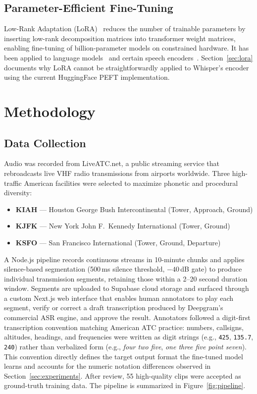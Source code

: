 \documentclass[11pt,a4paper]{article}
\begin{document}
\subsection{Parameter-Efficient Fine-Tuning}

Low-Rank Adaptation (LoRA)~\cite{hu2021lora} reduces the number of trainable
parameters by inserting low-rank decomposition matrices into transformer
weight matrices, enabling fine-tuning of billion-parameter models on constrained
hardware. It has been applied to language
models~\cite{dettmers2023qlora} and certain speech
encoders~\cite{kim2023loraspeech}. Section~\ref{sec:lora} documents why LoRA
cannot be straightforwardly applied to Whisper's encoder using the current
HuggingFace PEFT implementation.

\section{Methodology}
\label{sec:method}

\subsection{Data Collection}

Audio was recorded from LiveATC.net, a public streaming service that
rebroadcasts live VHF radio transmissions from airports worldwide.
Three high-traffic American facilities were selected to maximize phonetic
and procedural diversity:
\begin{itemize}[noitemsep]
  \item \textbf{KIAH} --- Houston George Bush Intercontinental (Tower,
        Approach, Ground)
  \item \textbf{KJFK} --- New York John F.\ Kennedy International (Tower,
        Ground)
  \item \textbf{KSFO} --- San Francisco International (Tower, Ground,
        Departure)
\end{itemize}

A Node.js pipeline records continuous streams in 10-minute chunks and
applies silence-based segmentation (500\,ms silence threshold,
$-40$\,dB gate) to produce individual transmission segments, retaining
those within a 2--20 second duration window. Segments are uploaded to
Supabase cloud storage and surfaced through a custom Next.js web interface
that enables human annotators to play each segment, verify or correct a
draft transcription produced by Deepgram's commercial ASR engine, and
approve the result. Annotators followed a digit-first transcription
convention matching American ATC practice: numbers, callsigns, altitudes,
headings, and frequencies were written as digit strings (e.g., \texttt{425},
\texttt{135.7}, \texttt{240}) rather than verbalized form (e.g.,
\textit{four two five}, \textit{one three five point seven}). This convention
directly defines the target output format the fine-tuned model learns and
accounts for the numeric notation differences observed in
Section~\ref{sec:experiments}. After review, 55 high-quality clips were
accepted as ground-truth training data. The pipeline is summarized in
Figure~\ref{fig:pipeline}.
\end{document}

